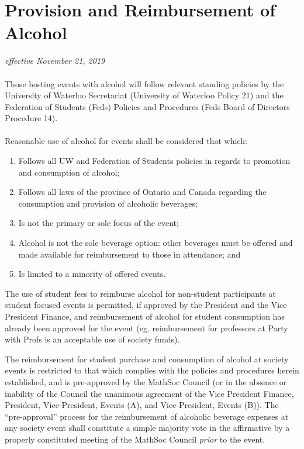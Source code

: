 \section{Provision and Reimbursement of Alcohol}
\emph{effective November 21, 2019}\\
\paragraph{}

Those hosting events with alcohol will follow relevant standing policies by the University of Waterloo Secretariat (University of Waterloo Policy 21) and the Federation of Students (Feds) Policies and Procedures (Feds Board of Directors Procedure 14).
\paragraph{}
Reasonable use of alcohol for events shall be considered that which:
\begin{enumerate}
\item Follows all UW and Federation of Students policies in regards to promotion and consumption of alcohol;
\item Follows all laws of the province of Ontario and Canada regarding the consumption and provision of alcoholic beverages;
\item Is not the primary or sole focus of the event;
\item Alcohol is not the sole beverage option: other beverages must be offered and made available for reimbursement to those in attendance; and
\item Is limited to a minority of offered events.
\end{enumerate}

The use of student fees to reimburse alcohol for non-student participants at student focused events is permitted, if approved by the President and the Vice President Finance, and reimbursement of alcohol for student consumption has already been approved for the event (eg. reimbursement for professors at Party with Profs is an acceptable use of society funds).

The reimbursement for student purchase and consumption of alcohol at society events is restricted to that which complies with the policies and procedures herein established, and is pre-approved by the MathSoc Council (or in the absence or inability of the Council the unanimous agreement of the Vice President Finance, President, Vice-President, Events (A), and Vice-President, Events (B)). The “pre-approval” process for the reimbursement of alcoholic beverage expenses at any society event shall constitute a simple majority vote in the affirmative by a properly constituted meeting of the MathSoc Council \textit{prior} to the event.

